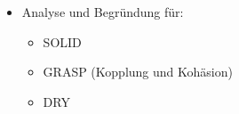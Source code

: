\begin{itemize}
	\item Analyse und Begründung für:
	\begin{itemize}
		\item SOLID
		\item GRASP (Kopplung und Kohäsion)
		\item DRY
	\end{itemize}
\end{itemize}